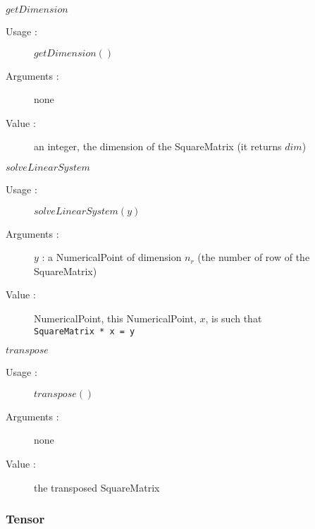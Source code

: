 \begin{description}
\begin{description}
  \item $getDimension$
    \begin{description}
    \item[Usage :] $getDimension()$
    \item[Arguments :] none
    \item[Value :] an integer, the dimension of the SquareMatrix (it returns $dim$)
    \end{description}
    \bigskip

  \item $solveLinearSystem$
    \begin{description}
    \item[Usage :] $solveLinearSystem(y)$
    \item[Arguments :] $y$ : a NumericalPoint of dimension $n_r$
      (the number of row of the SquareMatrix)
    \item[Value :] NumericalPoint, this NumericalPoint, $x$, is such that\\
      {\tt SquareMatrix * x = y}
    \end{description}
    \bigskip

  \item $transpose$
    \begin{description}
    \item[Usage :] $transpose()$
    \item[Arguments :] none
    \item[Value :] the transposed SquareMatrix
    \end{description}
    \bigskip
  \end{description}

\end{description}

\newpage \subsubsection{Tensor}

